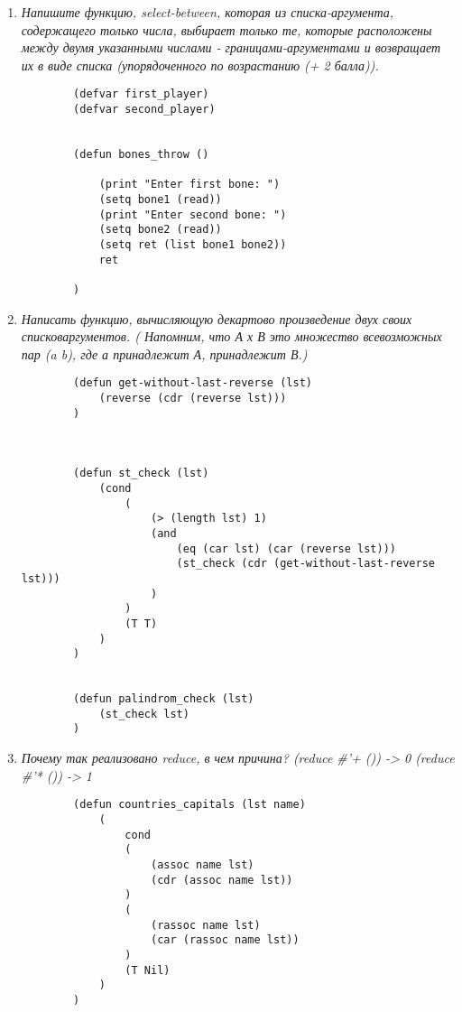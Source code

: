 \begin{enumerate}[wide=0pt]
	\begin{lstlisting}
		(defun swap-first-last (lst)
			(
				nconc 
				(last lst)
				(reverse 
					(cdr 
						(reverse (cdr lst)))
				)
				(list (car lst))
			)
		)
	\end{lstlisting}

	\item  \textit{Напишите функцию, select-between, которая из списка-аргумента, содержащего только
	числа, выбирает только те, которые расположены между двумя указанными числами -
	границами-аргументами и возвращает их в виде списка (упорядоченного по
	возрастанию (+ 2 балла)).}

	\begin{lstlisting}
		(defvar first_player)
		(defvar second_player)
		
		
		(defun bones_throw ()
		
			(print "Enter first bone: ")
			(setq bone1 (read))
			(print "Enter second bone: ")
			(setq bone2 (read))
			(setq ret (list bone1 bone2))
			ret
		
		)

	\end{lstlisting}

	\item  \textit{Написать функцию, вычисляющую декартово произведение двух своих списковаргументов. ( Напомним, что А х В это множество всевозможных пар (a b), где а
	принадлежит А, принадлежит В.)}
	\begin{lstlisting}
		(defun get-without-last-reverse (lst)
			(reverse (cdr (reverse lst)))
		)



		(defun st_check (lst)
			(cond
				(
					(> (length lst) 1)
					(and
						(eq (car lst) (car (reverse lst)))
						(st_check (cdr (get-without-last-reverse lst)))
					)
				)
				(T T)
			)
		)


		(defun palindrom_check (lst)
			(st_check lst)
		)
	\end{lstlisting}

	\item  \textit{Почему так реализовано reduce, в чем причина?
	(reduce \#'+ ()) -> 0 (reduce \#'* ()) -> 1}
	
	\begin{lstlisting}
		(defun countries_capitals (lst name)
			(
				cond 
				(
					(assoc name lst)
					(cdr (assoc name lst))
				)
				(
					(rassoc name lst)
					(car (rassoc name lst))
				)
				(T Nil)
			)
		)
	\end{lstlisting}




\end{enumerate}
